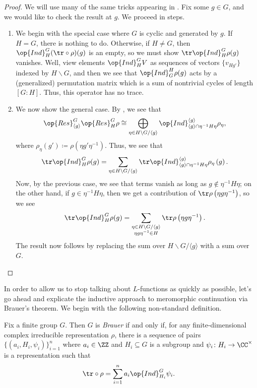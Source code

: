 \documentclass[../thesis.tex]{subfiles}
\begin{document}
\begin{proof}
	We will use many of the same tricks appearing in . Fix some $g\in G$, and we would like to check the result at $g$. We proceed in steps.
	\begin{enumerate}
		\item We begin with the special case where $G$ is cyclic and generated by $g$. If $H=G$, there is nothing to do. Otherwise, if $H\ne G$, then $\op{Ind}^G_H({\tr\circ\rho})(g)$ is an empty, so we must show $\tr\op{Ind}_H^G\rho(g)$ vanishes. Well, view elements $\op{Ind}_H^GV$ as sequences of vectors $\{v_{Hg'}\}$ indexed by $H\backslash G$, and then we see that $\op{Ind}_G^H\rho(g)$ acts by a (generalized) permutation matrix which is a sum of nontrivial cycles of length $[G:H]$. Thus, this operator has no trace.
		\item We now show the general case. By , we see that
		\[\op{Res}^G_{\langle g\rangle}\op{Res}^G_H\rho\cong\bigoplus_{\eta\in H\backslash G/\langle g\rangle}\op{Ind}^{\langle g\rangle}_{\langle g\rangle\cap\eta^{-1}H\eta}\rho_\eta,\]
		where $\rho_\eta(g')\coloneqq\rho\left(\eta g'\eta^{-1}\right)$. Thus, we see that
		\[\tr\op{Ind}_H^G\rho(g)=\sum_{\eta\in H\backslash G/\langle g\rangle}\tr\op{Ind}_{\langle g\rangle\cap\eta^{-1}H\eta}^{\langle g\rangle}\rho_\eta\left(g\right).\]
		Now, by the previous case, we see that terms vanish as long as $g\notin\eta^{-1}H\eta$; on the other hand, if $g\in\eta^{-1}H\eta$, then we get a contribution of $\tr\rho\left(\eta g\eta^{-1}\right)$, so we see
		\[\tr\op{Ind}_H^G\rho(g)=\sum_{\substack{\eta\in H\backslash G/\langle g\rangle\\\eta g\eta^{-1}\in H}}\tr\rho\left(\eta g\eta^{-1}\right).\]
		The result now follows by replacing the sum over $H\backslash G/\langle g\rangle$ with a sum over $G$.
		\qedhere
	\end{enumerate}
\end{proof}
In order to allow us to stop talking about $L$-functions as quickly as possible, let's go ahead and explicate the inductive approach to meromorphic continuation via Brauer's theorem. We begin with the following non-standard definition.
\begin{definition}[Brauer]
	Fix a finite group $G$. Then $G$ is \textit{Brauer} if and only if, for any finite-dimensional complex irreducible representation $\rho$, there is a sequence of pairs $\{(a_i,H_i,\psi_i)\}_{i=1}^n$ where $a_i\in\ZZ$ and $H_i\subseteq G$ is a subgroup and $\psi_i\colon H_i\to\CC^\times$ is a representation such that
	\[{\tr}\circ\rho=\sum_{i=1}^na_i\op{Ind}_{H_i}^G\psi_i.\]
\end{definition}
\end{document}
